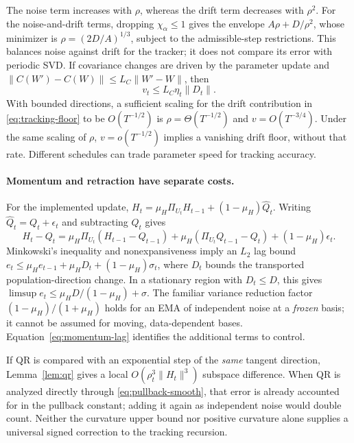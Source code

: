 The noise term increases with $\rho$, whereas the drift term decreases
with $\rho^2$. For the noise-and-drift terms, dropping
$\chi_\alpha\le1$ gives the envelope $A\rho+D/\rho^2$, whose minimizer is $\rho=(2D/A)^{1/3}$, subject to the
admissible-step restrictions. This balances noise against drift for the
tracker; it does not compare its error with periodic SVD.
If covariance changes are driven by the parameter update and
$\|C(W')-C(W)\|\le L_C\|W'-W\|$, then
\begin{equation}
 v_t\le L_C\eta_t\|D_t\|.
 \label{eq:coupling-drift}
\end{equation}
With bounded directions, a sufficient scaling for the drift contribution
in \eqref{eq:tracking-floor} to be $O(T^{-1/2})$ is
$\rho=\Theta(T^{-1/2})$ and $v=O(T^{-3/4})$. Under the same scaling of
$\rho$, $v=o(T^{-1/2})$ implies a vanishing drift floor, without that rate.
Different schedules can trade parameter speed for tracking accuracy.

\paragraph{Momentum and retraction have separate costs.}
For the implemented update,
$H_t=\mu_H\Pi_{U_t}H_{t-1}+(1-\mu_H)\widehat Q_t$.
Writing $\widehat Q_t=Q_t+\epsilon_t$ and subtracting $Q_t$ gives
\begin{equation}
 H_t-Q_t=\mu_H\Pi_{U_t}(H_{t-1}-Q_{t-1})
 +\mu_H(\Pi_{U_t}Q_{t-1}-Q_t)+(1-\mu_H)\epsilon_t.
 \label{eq:momentum-lag}
\end{equation}
Minkowski's inequality and nonexpansiveness imply an $L_2$ lag bound
$e_t\le\mu_He_{t-1}+\mu_HD_t+(1-\mu_H)\sigma_t$, where
$D_t$ bounds the transported population-direction change. In a stationary
region with $D_t\le D$, this gives
$\limsup e_t\le\mu_HD/(1-\mu_H)+\sigma$.
The familiar variance reduction factor $(1-\mu_H)/(1+\mu_H)$ holds for
an EMA of independent noise at a \emph{frozen} basis; it cannot be assumed
for moving, data-dependent bases. Equation~\eqref{eq:momentum-lag}
identifies the additional terms to control.

If QR is compared with an exponential step of the \emph{same} tangent
direction, Lemma~\ref{lem:qr} gives a local $O(\rho_t^3\|H_t\|^3)$
subspace difference. When QR is analyzed directly through
\eqref{eq:pullback-smooth}, that error is already accounted for in the
pullback constant; adding it again as independent noise would double count.
Neither the curvature upper bound nor positive curvature alone supplies a
universal signed correction to the tracking recursion.

